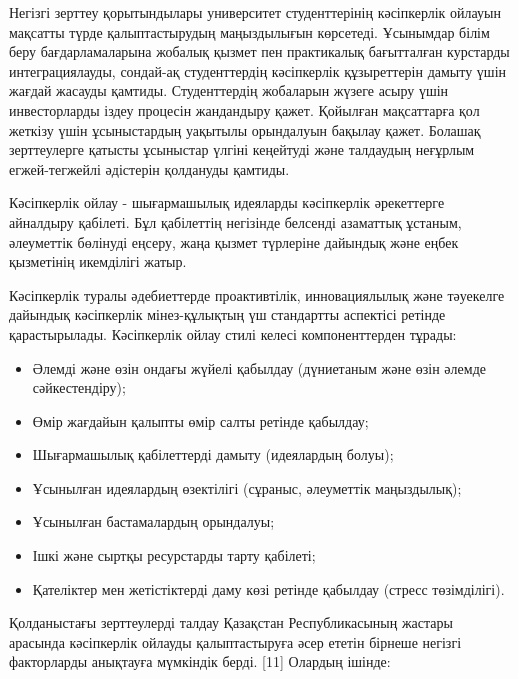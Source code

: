 Негізгі зерттеу қорытындылары университет студенттерінің кәсіпкерлік
ойлауын мақсатты түрде қалыптастырудың маңыздылығын көрсетеді. Ұсынымдар
білім беру бағдарламаларына жобалық қызмет пен практикалық бағытталған
курстарды интеграциялауды, сондай-ақ студенттердің кәсіпкерлік
құзыреттерін дамыту үшін жағдай жасауды қамтиды. Студенттердің жобаларын
жүзеге асыру үшін инвесторларды іздеу процесін жандандыру қажет.
Қойылған мақсаттарға қол жеткізу үшін ұсыныстардың уақытылы орындалуын
бақылау қажет. Болашақ зерттеулерге қатысты ұсыныстар үлгіні кеңейтуді
және талдаудың неғұрлым егжей-тегжейлі әдістерін қолдануды қамтиды.

Кәсіпкерлік ойлау - шығармашылық идеяларды кәсіпкерлік әрекеттерге
айналдыру қабілеті. Бұл қабілеттің негізінде белсенді азаматтық ұстаным,
әлеуметтік бөлінуді еңсеру, жаңа қызмет түрлеріне дайындық және еңбек
қызметінің икемділігі жатыр.

Кәсіпкерлік туралы әдебиеттерде проактивтілік, инновациялылық және
тәуекелге дайындық кәсіпкерлік мінез-құлықтың үш стандартты аспектісі
ретінде қарастырылады. Кәсіпкерлік ойлау стилі келесі компоненттерден
тұрады:

\begin{itemize}
\item
  Әлемді және өзін ондағы жүйелі қабылдау (дүниетаным және өзін әлемде
  сәйкестендіру);
\item
  Өмір жағдайын қалыпты өмір салты ретінде қабылдау;
\item
  Шығармашылық қабілеттерді дамыту (идеялардың болуы);
\item
  Ұсынылған идеялардың өзектілігі (сұраныс, әлеуметтік маңыздылық);
\item
  Ұсынылған бастамалардың орындалуы;
\item
  Ішкі және сыртқы ресурстарды тарту қабілеті;
\item
  Қателіктер мен жетістіктерді даму көзі ретінде қабылдау (стресс
  төзімділігі).
\end{itemize}

Қолданыстағы зерттеулерді талдау Қазақстан Республикасының жастары
арасында кәсіпкерлік ойлауды қалыптастыруға әсер ететін бірнеше негізгі
факторларды анықтауға мүмкіндік берді. {[}11{]} Олардың ішінде:

